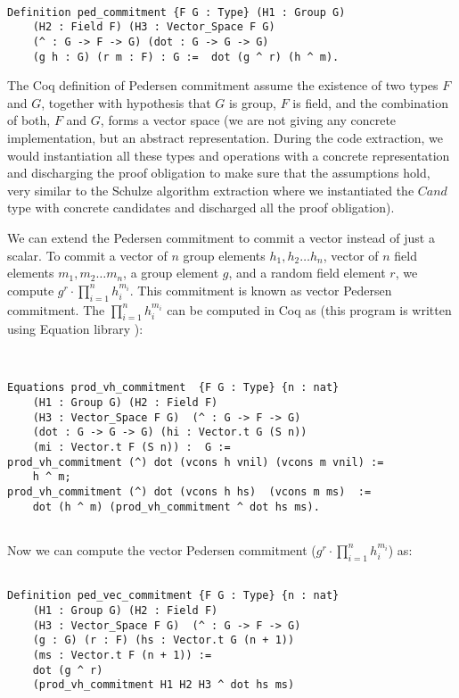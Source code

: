 \begin{verbatim}

Definition ped_commitment {F G : Type} (H1 : Group G) 
	(H2 : Field F) (H3 : Vector_Space F G) 
	(^ : G -> F -> G) (dot : G -> G -> G) 
	(g h : G) (r m : F) : G :=  dot (g ^ r) (h ^ m).

\end{verbatim}

\noindent
The Coq definition of Pedersen commitment assume the existence of two types
$F$ and $G$, together with hypothesis that $G$ is group, $F$ is field, and the combination 
of both, $F$ and $G$, forms a vector space (we are not giving any concrete implementation, 
but an abstract representation.  During the code extraction,  we would instantiation all 
these types and operations with a concrete representation and discharging the proof 
obligation to make sure that the assumptions hold, very similar to the Schulze algorithm 
extraction where we instantiated the $Cand$ type with concrete candidates 
and discharged all the proof obligation).


We can extend the Pedersen commitment to commit a vector instead of 
just a scalar.  To commit a
vector of $n$ group elements $h_{1}, h_{2} \dots h_{n}$, vector of $n$ 
field elements $m_{1}, m_{2} \dots m_{n}$,  a group element $g$,  and a random field element 
$r$,  we compute  $g^r \cdot \prod_{i = 1}^n  h_{i}^{m_{i}}$.  This commitment is 
known as vector Pedersen commitment.  
The $\prod_{i = 1}^n  h_{i}^{m_{i}}$ can be computed in Coq as 
(this program is written using Equation library \citep{Sozeau:2019:ERH:3352468.3341690}):

\begin{verbatim}


Equations prod_vh_commitment  {F G : Type} {n : nat} 
	(H1 : Group G) (H2 : Field F)
	(H3 : Vector_Space F G)  (^ : G -> F -> G) 
	(dot : G -> G -> G) (hi : Vector.t G (S n)) 
	(mi : Vector.t F (S n)) :  G :=
prod_vh_commitment (^) dot (vcons h vnil) (vcons m vnil) := 
	h ^ m;
prod_vh_commitment (^) dot (vcons h hs)  (vcons m ms)  := 
	dot (h ^ m) (prod_vh_commitment ^ dot hs ms).


\end{verbatim}

\noindent
Now we can compute the vector Pedersen commitment ($g^r \cdot  \prod_{i = 1}^n  h_{i}^{m_{i}}$) as:

\begin{verbatim}

Definition ped_vec_commitment {F G : Type} {n : nat} 
	(H1 : Group G) (H2 : Field F)
	(H3 : Vector_Space F G)  (^ : G -> F -> G)
	(g : G) (r : F) (hs : Vector.t G (n + 1))
	(ms : Vector.t F (n + 1)) := 
	dot (g ^ r) 
	(prod_vh_commitment H1 H2 H3 ^ dot hs ms)  
\end{verbatim}
  
